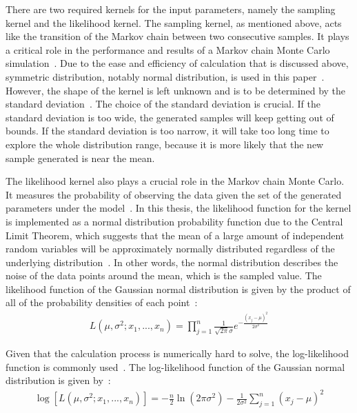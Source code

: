 There are two required kernels for the input parameters, namely the sampling kernel and the likelihood kernel. The sampling kernel, as mentioned above, acts like the transition of the Markov chain between two consecutive samples. It plays a critical role in the performance and results of a Markov chain Monte Carlo simulation~\cite{mcmc_practice}. Due to the ease and efficiency of calculation that is discussed above, symmetric distribution, notably normal distribution, is used in this paper~\cite{gaussian_distribution_property}. However, the shape of the kernel is left unknown and is to be determined by the standard deviation~\cite{normal}. The choice of the standard deviation is crucial. If the standard deviation is too wide, the generated samples will keep getting out of bounds. If the standard deviation is too narrow, it will take too long time to explore the whole distribution range, because it is more likely that the new sample generated is near the mean. 

The likelihood kernel also plays a crucial role in the Markov chain Monte Carlo. It measures the probability of observing the data given the set of the generated parameters under the model~\cite{likelihood_general}. In this thesis, the likelihood function for the kernel is implemented as a normal distribution probability function due to the Central Limit Theorem, which suggests that the mean of a large amount of independent random variables will be approximately normally distributed regardless of the underlying distribution~\cite{central_limit_theorem}. In other words, the normal distribution describes the noise of the data points around the mean, which is the sampled value. The likelihood function of the Gaussian normal distribution is given by the product of all of the probability densities of each point~\cite{gaussian_likelihood}:
\begin{align}
    L(\mu, \sigma^2; x_1, ..., x_n) = \prod_{j=1}^n \frac{1}{\sqrt{2\pi}\sigma} e^{-\frac{(x_j-\mu)^2}{2\sigma^2}}
\end{align}

Given that the calculation process is numerically hard to solve, the log-likelihood function is commonly used~\cite{log_likelihood}. The log-likelihood function of the Gaussian normal distribution is given by~\cite{log_gaussian_likelihood}:
\begin{align}
    \log[L(\mu, \sigma^2; x_1, ..., x_n)] = -\frac n 2\ln(2\pi\sigma^2) - \frac 1 {2\sigma^2}\sum_{j=1}^n (x_j - \mu)^2
\end{align}
 
